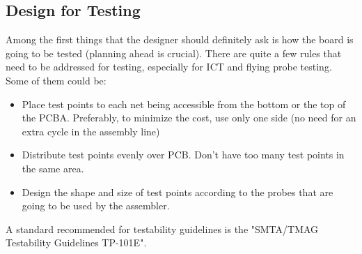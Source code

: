 \documentclass[final]{cubedoc}
\begin{document}
	\subsection{Design for Testing}
	
	
	
	Among the first things that the designer should definitely ask is how the board is going to be tested (planning ahead is crucial). There are quite a few rules that need to be addressed for testing, especially for ICT and flying probe testing. Some of them could be:
	
	\begin{itemize}
		\item Place test points to each net being accessible from the bottom or the top of the PCBA. Preferably, to minimize the cost, use only one side (no need for an extra cycle in the assembly line) 
		
		
		\item Distribute test points evenly over PCB. Don't have too many test points in the same area. 
		\item Design the shape and size of test points according to the probes that are going to be used by the assembler.
	\end{itemize}
	
	A standard recommended for testability guidelines is the "SMTA/TMAG Testability Guidelines TP-101E".
	
\end{document}
